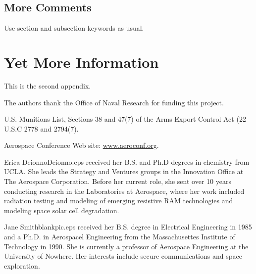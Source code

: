 \documentclass[twocolumn,letterpaper]{IEEEAerospaceCLS}  %
\begin{document}
\subsection{More Comments}
Use section and subsection keywords as usual.

\section{Yet More Information}    %
This is the second appendix.



\acknowledgments
The authors thank the Office of Naval Research for funding this project.




%
\begin{thebibliography}{1}

U.S. Munitions List, Sections 38 and 47(7) of the Arms Export Control Act (22 U.S.C 2778 and 2794(7).

Aerospace Conference Web site: \underline{www.aeroconf.org}.

\end{thebibliography}


\thebiography
\begin{biographywithpic}
{Erica Deionno}{Deionno.eps}
received her B.S. and Ph.D degrees in chemistry from UCLA. She leads the Strategy and Ventures groups in the Innovation Office at The Aerospace Corporation. Before her current role, she sent over 10 years conducting research in the Laboratories at Aerospace, where her work included radiation testing and modeling of emerging resistive RAM technologies and modeling space solar cell degradation.
\end{biographywithpic} 

\begin{biographywithpic}
{Jane Smith}{blankpic.eps}
received her B.S. degree in Electrical Engineering in 1985 and a Ph.D. in Aerospacel Engineering from the Massachusettes Institute of Technology in 1990. She is currently a professor of Aerospace Engineering at the University of Nowhere. Her interests include secure communications and space exploration.

\end{biographywithpic}
\end{document}
